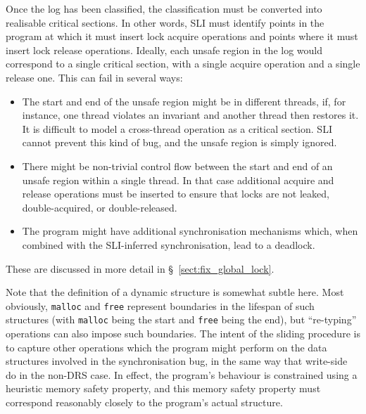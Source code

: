 Once the log has been classified, the classification must be converted into realisable critical sections.
In other words, SLI must identify points in the program at which it must insert lock acquire operations and points where it must insert lock release operations.
Ideally, each unsafe region in the log would correspond to a single critical section, with a single acquire operation and a single release one.
This can fail in several ways:

\begin{itemize}
\item
  The start and end of the unsafe region might be in different threads, if, for instance, one thread violates an invariant and another thread then restores it.
  It is difficult to model a cross-thread operation as a critical section.
  SLI cannot prevent this kind of bug, and the unsafe region is simply ignored.
\item
  There might be non-trivial control flow between the start and end of an unsafe region within a single thread.
  In that case additional acquire and release operations must be inserted to ensure that locks are not leaked, double-acquired, or double-released.
\item
  The program might have additional synchronisation mechanisms which, when combined with the SLI-inferred synchronisation, lead to a deadlock.
\end{itemize}

These are discussed in more detail in \S~\ref{sect:fix_global_lock}.


Note that the definition of a dynamic structure is somewhat subtle here.
Most obviously, \verb|malloc| and \verb|free| represent boundaries in the lifespan of such structures (with \verb|malloc| being the start and \verb|free| being the end), but ``re-typing'' operations can also impose such boundaries.
The intent of the sliding procedure is to capture other operations which the program might perform on the data structures involved in the synchronisation bug, in the same way that write-side \StateMachines do in the non-DRS case.
In effect, the program's behaviour is constrained using a heuristic memory safety property, and this memory safety property must correspond reasonably closely to the program's actual structure.

